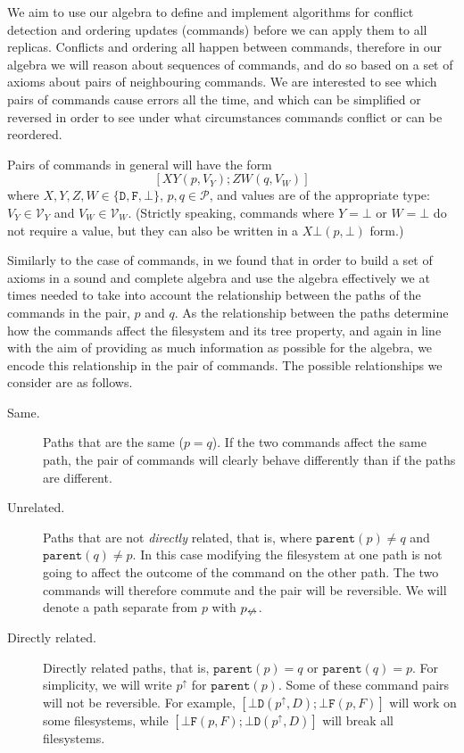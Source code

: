 \documentclass[12pt]{article}
\newcommand{\setvx}[1]{\mathcal{V}_{#1}}
\newcommand{\setp}{\mathcal{P}}
\newcommand{\empt}{\bot}
\newcommand{\parent}{\mathtt{parent}}
\newcommand{\pp}{p^\uparrow} %
\newcommand{\np}{p_{\centernot\leftrightarrow}} %
\newcommand{\fscommand}[2]{{#1#2}}
\newcommand{\fsregcommandchar}[1]{\mathtt{#1}}
\newcommand{\fsregcommand}[2]{\fscommand{\fsregcommandchar{#1}}{\fsregcommandchar{#2}}}
\newcommand{\cbf}{\fsregcommand{\empt}{F}}
\newcommand{\cbd}{\fsregcommand{\empt}{D}}
\newcommand{\cxy}{\fscommand{X}{Y}}
\newcommand{\czw}{\fscommand{Z}{W}}
\begin{document}
We aim to use our algebra to define and implement algorithms for conflict detection
and ordering updates (commands) before we can apply them to all replicas.
Conflicts and ordering all happen between commands, therefore in our algebra
we will reason about sequences of commands, 
and do so based on a set of axioms about pairs of neighbouring commands.
We are interested to see which pairs of commands cause errors all the time,
and which can be simplified or reversed
in order to see under what circumstances commands conflict or can be reordered.

Pairs of commands in general will have the form
\[ [\cxy(p,V_Y); \czw(q,V_W)] \]
where $X,Y,Z,W\in\{\fsregcommandchar{D},\fsregcommandchar{F},\empt\}$, $p,q\in\setp$, and values are of the appropriate type: 
$V_Y\in\setvx{Y}$ and $V_W\in\setvx{W}$.
(Strictly speaking, commands where $Y=\empt$ or $W=\empt$ do not require a value,
but they can also be written in a $\fscommand{X}{\empt}(p, \empt)$ form.)

Similarly to the case of commands, in \cite{NREC:alg} we found that in order to build
a set of axioms in a sound and complete algebra and use the algebra effectively we at times needed to take into account
the relationship between the paths of the commands in the pair, $p$ and $q$.
As the relationship between the paths determine how the commands affect the filesystem
and its tree property, 
and again in line with the aim of providing as much information as possible for the algebra,
we encode this relationship in the pair of commands. The possible relationships we
consider are as follows.

\begin{description}
\item[Same.] Paths that are the same ($p=q$). If the two commands affect the same path, the pair of commands
will clearly behave differently than if the paths are different.
%
\item[Unrelated.] Paths that are not \emph{directly} related,
that is, where $\parent(p)\neq q$ and $\parent(q)\neq p$. 
In this case modifying the filesystem at one path is not going
to affect the outcome of the command on the other path.
The two commands will therefore commute and the pair will be reversible.
We will denote a path separate from $p$ with $\np$.
%
\item[Directly related.] Directly related paths, that is, $\parent(p)=q$ or $\parent(q)=p$.
For simplicity, we will write $\pp$ for $\parent(p)$.
Some of these command pairs will not be reversible.
For example, $[\cbd(\pp,D);\cbf(p,F)]$ will work on some filesystems,
while $[\cbf(p,F);\cbd(\pp,D)]$ will break all filesystems.
\end{description}
\end{document}
